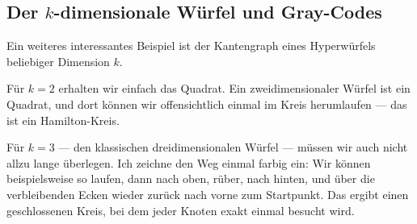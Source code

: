 \begin{math-stroke}
\begin{center}
\end{center}
\end{math-stroke}

\subsection{Der \texorpdfstring{$k$}{k}-dimensionale Würfel und Gray-Codes}

\begin{spoken-clean}[00:38:07 - 00:40:08]
Ein weiteres interessantes Beispiel ist der Kantengraph eines Hyperwürfels beliebiger Dimension $k$. 

Für $k=2$ erhalten wir einfach das Quadrat. Ein zweidimensionaler Würfel ist ein Quadrat, und dort können wir offensichtlich einmal im Kreis herumlaufen --- das ist ein Hamilton-Kreis.

Für $k=3$ --- den klassischen dreidimensionalen Würfel --- müssen wir auch nicht allzu lange überlegen. Ich zeichne den Weg einmal farbig ein: Wir können beispielsweise so laufen, dann nach oben, rüber, nach hinten, und über die verbleibenden Ecken wieder zurück nach vorne zum Startpunkt. Das ergibt einen geschlossenen Kreis, bei dem jeder Knoten exakt einmal besucht wird.
\end{spoken-clean}

